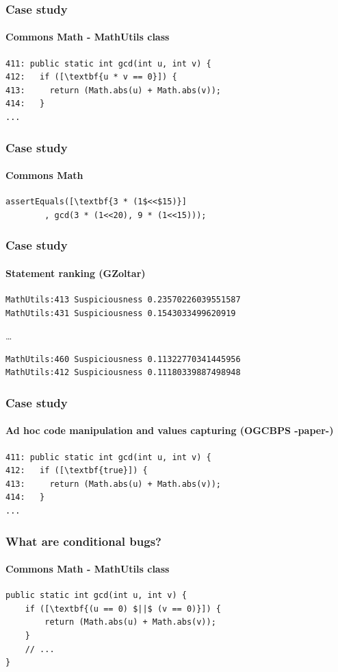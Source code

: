 \documentclass[onlymath]{beamer}
\begin{document}
 \begin{frame}[fragile]
    \frametitle{Case study}
      \framesubtitle{Commons Math - MathUtils class}
\begin{lstlisting}[escapeinside=\[\]]
411: public static int gcd(int u, int v) {
412:   if ([\textbf{u * v == 0}]) {
413:     return (Math.abs(u) + Math.abs(v));
414:   }
...
\end{lstlisting}
\end{frame}

 \begin{frame}[fragile]
    \frametitle{Case study}
      \framesubtitle{Commons Math}
        \begin{lstlisting}[escapeinside=\[\]]
assertEquals([\textbf{3 * (1$<<$15)}]
        , gcd(3 * (1<<20), 9 * (1<<15)));
	\end{lstlisting}
\end{frame}

 \begin{frame}[fragile]
    \frametitle{Case study}
      \framesubtitle{Statement ranking (GZoltar)}
\begin{verbatim}
MathUtils:413 Suspiciousness 0.23570226039551587
MathUtils:431 Suspiciousness 0.1543033499620919
\end{verbatim}
\dots
\begin{verbatim}
MathUtils:460 Suspiciousness 0.11322770341445956
MathUtils:412 Suspiciousness 0.11180339887498948
\end{verbatim}
\end{frame}

 \begin{frame}[fragile]
    \frametitle{Case study}
      \framesubtitle{Ad hoc code manipulation and values capturing (OGCBPS -paper-)}
\begin{lstlisting}[escapeinside=\[\]]
411: public static int gcd(int u, int v) {
412:   if ([\textbf{true}]) {
413:     return (Math.abs(u) + Math.abs(v));
414:   }
...
\end{lstlisting}
\end{frame}

 \begin{frame}[fragile]
    \frametitle{What are conditional bugs?}
    \framesubtitle{Commons Math - MathUtils class}
        \begin{lstlisting}[escapeinside=\[\]]
public static int gcd(int u, int v) {
    if ([\textbf{(u == 0) $||$ (v == 0)}]) {
        return (Math.abs(u) + Math.abs(v));
    }
    // ...
}
	\end{lstlisting}
\end{frame}
\end{document}
